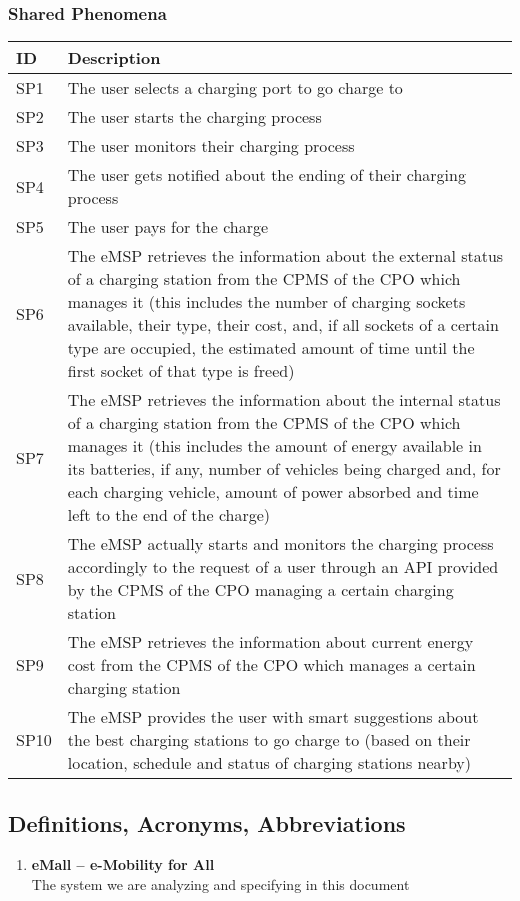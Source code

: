 \subsubsection{Shared Phenomena}
\begin{table}[h!]
    \centering
    \begin{tabular}{|m{0.9cm}|m{10.5cm}|}
    \hline
      \bfseries ID & \bfseries Description\\
      \hline
      \centering SP1 & The user selects a charging port to go charge to\\
      \hline
      \centering SP2 & The user starts the charging process\\
      \hline
      \centering SP3 & The user monitors their charging process\\
      \hline
      \centering SP4 & The user gets notified about the ending of their charging process\\
      \hline
      \centering SP5 & The user pays for the charge\\
      \hline
      \centering SP6 & The eMSP retrieves the information about the external status of a charging station from the CPMS of the CPO which manages it (this includes the number of charging sockets
      available, their type, their cost, and, if all sockets of a certain type are occupied, the estimated amount of time until the first socket of that type is freed)\\
      \hline
      \centering SP7 & The eMSP retrieves the information about the internal status of a charging station from the CPMS of the CPO which manages it (this includes the amount of energy available in its batteries, if any, number of vehicles being charged and, for each charging vehicle, amount of power absorbed and time left to the end of the charge)\\
      \hline
      \centering SP8 & The eMSP actually starts and monitors the charging process accordingly to the request of a user through an API provided by the CPMS of the CPO managing a certain charging station\\
      \hline
      \centering SP9 & The eMSP retrieves the information about current energy cost from the CPMS of the CPO which manages a certain charging station\\
      \hline
      \centering SP10 & The eMSP provides the user with smart suggestions about the best charging stations to go charge to (based on their location, schedule and status of charging stations nearby)\\
      \hline
    \end{tabular}
\end{table}

\subsection{Definitions, Acronyms, Abbreviations}
\begin{enumerate}
    \item{\textbf{eMall – e-Mobility for All}\\The system we are analyzing and specifying in this document}
    
\end{enumerate}



